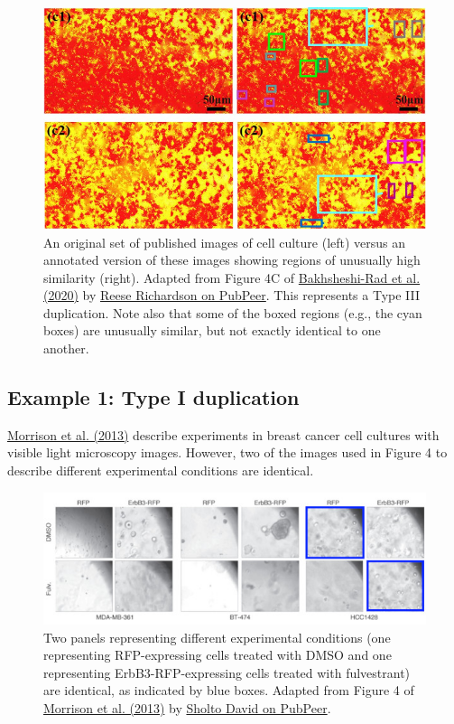 \documentclass[letterpaper, 12pt]{article}
\begin{document}
\begin{figure}[h!tbp]
    \centering
    \includegraphics[width=\textwidth]{img/image_duplication/Bakhsheshi-Rad_annotation.JPG}
    \caption*{An original set of published images of cell culture (left) versus an annotated version of these images showing regions of unusually high similarity (right). Adapted from Figure 4C of \href{https://doi.org/10.1016/j.polymertesting.2019.106298}{Bakhsheshi-Rad et al. (2020)} by \href{https://pubpeer.com/publications/60A225978670EFD93446CAC5696F7F\#1}{Reese Richardson on PubPeer}. This represents a Type III duplication. Note also that some of the boxed regions (e.g., the cyan boxes) are unusually similar, but not exactly identical to one another.}
\end{figure}

\subsection*{Example 1: Type I duplication}

\href{https://doi.org/10.1172/JCI66764}{Morrison et al. (2013)} describe experiments in breast cancer cell cultures with visible light microscopy images. However, two of the images used in Figure 4 to describe different experimental conditions are identical.

\begin{figure}[h!tbp]
    \centering
    \includegraphics[width=\textwidth]{img/image_duplication/image-1744937326665.jpg}
    \caption*{Two panels representing different experimental conditions (one representing RFP-expressing cells treated with DMSO and one representing ErbB3-RFP-expressing cells treated with fulvestrant) are identical, as indicated by blue boxes. Adapted from Figure 4 of \href{https://doi.org/10.1172/JCI66764}{Morrison et al. (2013)} by \href{https://pubpeer.com/publications/2768B5B42E7338AB72D4CFE660596A\#1}{Sholto David on PubPeer}.}
\end{figure}
\end{document}
